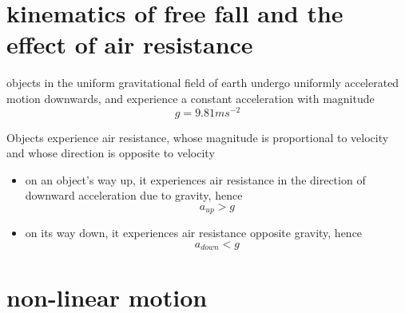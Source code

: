 \documentclass[a4paper, 10pt]{article}
\begin{document}
\section{kinematics of free fall and the effect of air resistance}
objects in the uniform gravitational field of earth undergo uniformly accelerated motion downwards, and experience a constant acceleration with magnitude
\[
   g = 9.81ms^{-2}
\]


Objects experience air resistance, whose magnitude is proportional to velocity and whose direction is opposite to velocity
\begin{itemize}
   \item on an object's way up, it experiences air resistance in the direction of downward acceleration due to gravity, hence \[
   a_{up} > g
   \]
   \item on its way down, it experiences air resistance opposite gravity, hence \[
         a_{down} < g
   \]
   
\end{itemize}	


\section{non-linear motion}
\end{document}
